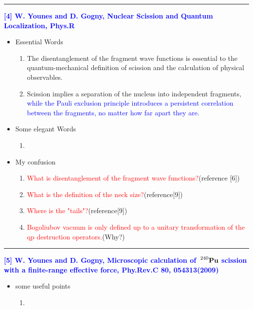 \vspace{8pt}
\noindent\rule[0.25\baselineskip]{\textwidth}{2pt}
\noindent \textcolor{blue}{\textbf{[4] W. Younes and D. Gogny, Nuclear Scission and Quantum Localization, Phys.R}}
\begin{itemize}[leftmargin=10pt]
    \item Essential Words
    \begin{enumerate}[leftmargin=10pt]
        \item The disentanglement of the fragment wave functions is essential to the quantum-mechanical definition of scission and the calculation of physical observables.
        \item Scission implies a separation of the nucleus into independent fragments, \textcolor{blue}{while the Pauli exclusion principle introduces a persistent correlation between the fragments, no matter how far apart they are.}
    \end{enumerate}

    \vspace{5pt}
    \item Some elegant Words
        \begin{enumerate}[leftmargin=10pt]
            \item 
        \end{enumerate}
    
    \vspace{5pt}
    \item My confusion
        \begin{enumerate}[leftmargin=10pt]
            \item \textcolor{red}{What is disentanglement of the fragment wave functions?}(reference [6])
            \item \textcolor{red}{What is the definition of the neck size?}(reference[9])
            \item \textcolor{red}{Where is the "tails"?}(reference[9])
            \item \textcolor{red}{Bogoliubov vacuum is only defined up to a unitary transformation of the qp destruction operators.}(Why?)
        \end{enumerate}
\end{itemize}

\vspace{8pt}
\noindent\rule[0.25\baselineskip]{\textwidth}{2pt}
\noindent \textcolor{blue}{\textbf{[5] W. Younes and D. Gogny, Microscopic calculation of $\sideset{^{240}}{}{\mathop{\mathbf{Pu}}}$ scission with a finite-range effective force, Phy.Rev.C 80, 054313(2009)}}
\begin{itemize}[leftmargin=10pt]
    \item some useful points
    \begin{enumerate}[leftmargin=10pt]
        \item 
    \end{enumerate}
\end{itemize}

